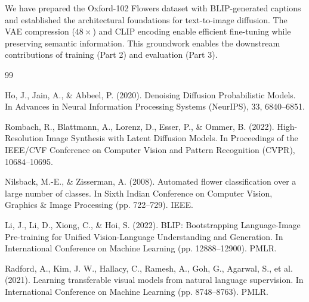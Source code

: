 \documentclass[11pt]{article}
\begin{document}
We have prepared the Oxford-102 Flowers dataset with BLIP-generated captions and established the architectural foundations for text-to-image diffusion. The VAE compression ($48\times$) and CLIP encoding enable efficient fine-tuning while preserving semantic information. This groundwork enables the downstream contributions of training (Part 2) and evaluation (Part 3).

\begin{thebibliography}{99}

 Ho, J., Jain, A., \& Abbeel, P. (2020). Denoising Diffusion Probabilistic Models. In Advances in Neural Information Processing Systems (NeurIPS), 33, 6840--6851.

 Rombach, R., Blattmann, A., Lorenz, D., Esser, P., \& Ommer, B. (2022). High-Resolution Image Synthesis with Latent Diffusion Models. In Proceedings of the IEEE/CVF Conference on Computer Vision and Pattern Recognition (CVPR), 10684--10695.

 Nilsback, M.-E., \& Zisserman, A. (2008). Automated flower classification over a large number of classes. In Sixth Indian Conference on Computer Vision, Graphics \& Image Processing (pp. 722--729). IEEE.

 Li, J., Li, D., Xiong, C., \& Hoi, S. (2022). BLIP: Bootstrapping Language-Image Pre-training for Unified Vision-Language Understanding and Generation. In International Conference on Machine Learning (pp. 12888--12900). PMLR.

 Radford, A., Kim, J. W., Hallacy, C., Ramesh, A., Goh, G., Agarwal, S., et al. (2021). Learning transferable visual models from natural language supervision. In International Conference on Machine Learning (pp. 8748--8763). PMLR.

\end{thebibliography}
\end{document}
